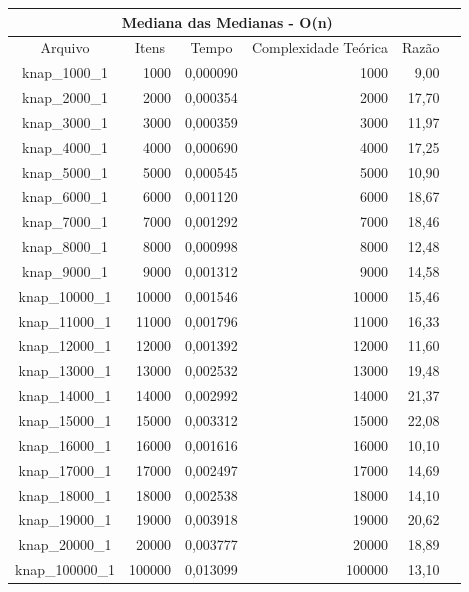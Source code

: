 \documentclass[
	12pt,				%
	oneside,			%
	a4paper,			%
	english,			%
	french,				%
	spanish,			%
	brazil,				%
	]{abntex2}
\begin{document}
\begin{longtable}{|c|r|r|r|r|r|}
\toprule
\multicolumn{5}{|c|}{\cellcolor{gray!25}\textbf{Mediana das Medianas - O(n)}}\\
\midrule
\multicolumn{1}{|c|}{\cellcolor{gray!10}Arquivo} & \multicolumn{1}{|c|}{\cellcolor{gray!10}Itens} &  \multicolumn{1}{|c|}{\cellcolor{gray!10}Tempo} &
\multicolumn{1}{|c|}{\cellcolor{gray!10}Complexidade Teórica} &
\multicolumn{1}{|c|}{\cellcolor{gray!10}Razão}\\ \hline
\hline
knap\_1000\_1	&	1000	&	0,000090	&	1000	&	9,00	 \\ \hline
knap\_2000\_1	&	2000	&	0,000354	&	2000	&	17,70	 \\ \hline
knap\_3000\_1	&	3000	&	0,000359	&	3000	&	11,97	 \\ \hline
knap\_4000\_1	&	4000	&	0,000690	&	4000	&	17,25	 \\ \hline
knap\_5000\_1	&	5000	&	0,000545	&	5000	&	10,90	 \\ \hline
knap\_6000\_1	&	6000	&	0,001120	&	6000	&	18,67	 \\ \hline
knap\_7000\_1	&	7000	&	0,001292	&	7000	&	18,46	 \\ \hline
knap\_8000\_1	&	8000	&	0,000998	&	8000	&	12,48	 \\ \hline
knap\_9000\_1	&	9000	&	0,001312	&	9000	&	14,58	 \\ \hline
knap\_10000\_1	&	10000	&	0,001546	&	10000	&	15,46	 \\ \hline
knap\_11000\_1	&	11000	&	0,001796	&	11000	&	16,33	 \\ \hline
knap\_12000\_1	&	12000	&	0,001392	&	12000	&	11,60	 \\ \hline
knap\_13000\_1	&	13000	&	0,002532	&	13000	&	19,48	 \\ \hline
knap\_14000\_1	&	14000	&	0,002992	&	14000	&	21,37	 \\ \hline
knap\_15000\_1	&	15000	&	 0,003312	&	15000	&	22,08	 \\ \hline
knap\_16000\_1	&	16000	&	0,001616	&	16000	&	10,10	 \\ \hline
knap\_17000\_1	&	17000	&	0,002497	&	17000	&	14,69	 \\ \hline
knap\_18000\_1	&	18000	&	0,002538	&	18000	&	14,10	 \\ \hline
knap\_19000\_1	&	19000	&	0,003918	&	19000	&	20,62	 \\ \hline
knap\_20000\_1	&	20000	&	0,003777	&	20000	&	18,89	 \\ \hline
knap\_100000\_1	&	100000	&	0,013099	&	100000	&	13,10	 \\ \hline
\end{longtable}
\end{document}
